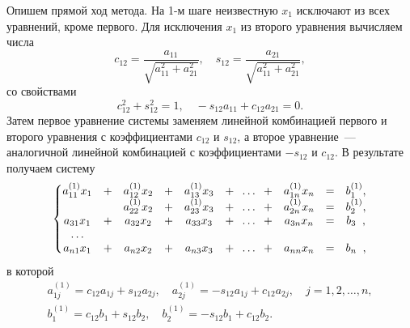 \documentclass[12pt]{article}
\begin{document}
    Опишем прямой ход метода. На 1-м шаге неизвестную $x_1$ исключают из всех уравнений, кроме первого. Для исключения $x_1$ из второго уравнения вычисляем числа
    \begin{equation}
    	c_{12}=\frac{a_{11}}{\sqrt{a^{2}_{11}+a^{2}_{21}}},\quad s_{12}=\frac{a_{21}}{\sqrt{a_{11}^2+a^2_{21}}},\label{fm1}
    \end{equation}
    со свойствами 
    \begin{equation}
    	c^2_{12}+s^2_{12}=1,\quad -s_{12}a_{11}+c_{12}a_{21}=0.\label{fm2}
    \end{equation}
	Затем первое уравнение системы заменяем линейной комбинацией первого и второго уравнения с коэффициентами $c_{12}$ и $s_{12}$, а второе уравнение~--- аналогичной линейной комбинацией с коэффициентами $-s_{12}$ и $c_{12}$. В результате получаем систему
	\begin{equation}
		\begin{gathered}
		\left\{
		\begin{matrix}
		a_{11}^{\left(1\right)}x_1 &+ &a_{12}^{\left(1\right)}x_2 &+ &a_{13}^{\left(1\right)}x_3&+\hspace{2mm}\ldots\hspace{2mm}+&a_{1n}^{\left(1\right)}x_n & = &b_{1}^{\left(1\right)},\\
		&&a_{22}^{\left(1\right)}x_2&+&a_{23}^{\left(1\right)}x_3&+\hspace{2mm}\ldots\hspace{2mm}+&a_{2n}^{\left(1\right)}x_n&=&b_{2}^{\left(1\right)},\\
		a_{31}x_1 & + & a_{32}x_2 & + & a_{33}x_3 & +\hspace{2mm}\ldots \hspace{2mm}+ &a_{3n}x_n&=&b_{3}\hspace{1.9mm},\\
		\ldots\\
		a_{n1}x_1 & + & a_{n2}x_2 & + & a_{n3}x_3 & +\hspace{2mm}\ldots \hspace{2mm}+ &a_{nn}x_n&=&b_{n}\hspace{1.9mm},
		\end{matrix}
		\right.
		\end{gathered}\label{fm3}
	\end{equation}
	в которой
	\begin{equation}
		\begin{gathered}
			a_{1j}^{\left(1\right)}=c_{12}a_{1j}+s_{12}a_{2j},\quad a_{2j}^{\left(1\right)}=-s_{12}a_{1j}+c_{12}a_{2j},\quad j=1,2,\ldots,n,\\
			b_1^{\left(1\right)}=c_{12}b_1+s_{12}b_2,\quad b_2^{\left(1\right)}=-s_{12}b_1+c_{12}b_2.
		\end{gathered}
	\end{equation}
	
\end{document}
